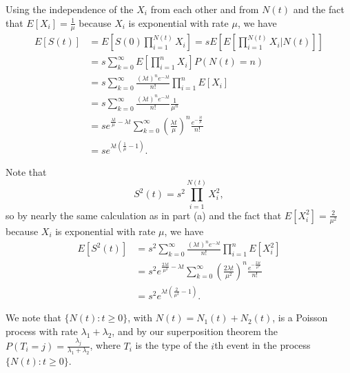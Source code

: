 \documentclass{homework}
\begin{document}
	\begin{alphaparts}
		\questionpart Using the independence of the $X_i$ from each other and from $N(t)$ and the fact that $E[X_i] = \frac{1}{\mu}$ because $X_i$ is exponential with rate $\mu$, we have
		\begin{align*}
			E[S(t)] &= E\left[S(0)\prod_{i=1}^{N(t)}X_i\right] = sE\left[E\left[\prod_{i=1}^{N(t)}X_i\bigg\vert N(t)\right]\right] \\
			&= s\sum_{k=0}^\infty E\left[\prod_{i=1}^n X_i\right]P(N(t)=n) \\
			&= s\sum_{k=0}^\infty \frac{(\lambda t)^ne^{-\lambda t}}{n!}\prod_{i=1}^nE[X_i] \\
			&= s\sum_{k=0}^\infty \frac{(\lambda t)^ne^{-\lambda t}}{n!}\frac{1}{\mu^n} \\
			&= se^{\frac{\lambda t}{\mu} - \lambda t}\sum_{k=0}^\infty \left(\frac{\lambda t}{\mu}\right)^n\frac{e^{-\frac{\lambda t}{\mu}}}{n!} \\
			&= se^{\lambda t \left(\frac{1}{\mu} - 1\right)}.
		\end{align*}
		
		\questionpart Note that
		\begin{equation*}
			S^2(t) = s^2\prod_{i=1}^{N(t)}X_i^2,
		\end{equation*}
		so by nearly the same calculation as in part (a) and the fact that $E[X_i^2] = \frac{2}{\mu^2}$ because $X_i$ is exponential with rate $\mu$, we have
		\begin{align*}
			E[S^2(t)] &= s^2\sum_{k=0}^\infty \frac{(\lambda t)^ne^{-\lambda t}}{n!}\prod_{i=1}^nE[X_i^2] \\
			&= s^2e^{\frac{2\lambda t}{\mu^2} - \lambda t}\sum_{k=0}^\infty \left(\frac{2\lambda t}{\mu^2}\right)^n \frac{e^{-\frac{2\lambda t}{\mu^2}}}{n!} \\
			&= s^2e^{\lambda t\left(\frac{2}{\mu^2}-1\right)}.
		\end{align*}
	\end{alphaparts}
	
	We note that $\{N(t) : t\ge 0\}$, with $N(t) = N_1(t) + N_2(t)$, is a Poisson process with rate $\lambda_1 + \lambda_2$, and by our superposition theorem the $P(T_i = j) = \frac{\lambda_j}{\lambda_1 + \lambda_2}$, where $T_i$ is the type of the $i$th event in the process $\{N(t) : t \ge 0\}$.
	
\end{document}
